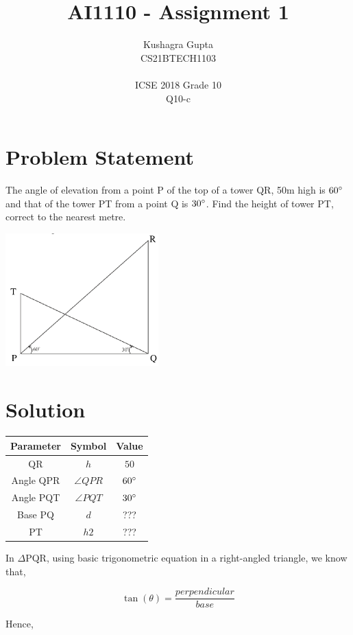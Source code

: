 \documentclass[twocoloumn]{article}
\title{AI1110 - Assignment 1}
\author{Kushagra Gupta \\ \normalsize CS21BTECH1103 \\ \vspace*{20pt}\\ \vspace*{20pt} \Large ICSE 2018 Grade 10 \\ \large Q10-c}
\date{}
\begin{document}
\maketitle 
\begin{multicols}{2}
\section*{Problem Statement}


The angle of elevation from a point P of the top of a tower QR, 50m high is $60\degree$ and that of the
tower PT from a point Q is $30\degree$. Find the height of tower PT, correct to the nearest metre.

\begin{center}
\includegraphics[width=167.5pt]{figure.png}
\end{center}
\section*{Solution}

\begin{tabular}{|c|c|c|}
\hline
\textbf{Parameter} & \textbf{Symbol} & \textbf{Value} \\
\hline
QR & $h$ & $50$ \\
\hline
Angle QPR & $\angle QPR$ & $60\degree$ \\
\hline
Angle PQT & $\angle PQT$ & $30\degree$ \\
\hline
Base PQ & $d$ & ??? \\
\hline
PT & $h2$ & ??? \\
\hline
\end{tabular}

In $\Delta$PQR, using basic trigonometric equation in a right-angled triangle, we know that,

\begin{equation}
    \tan(\theta)=\frac{perpendicular}{base}
\end{equation}

\noindent Hence, 


\end{multicols}
\end{document}
